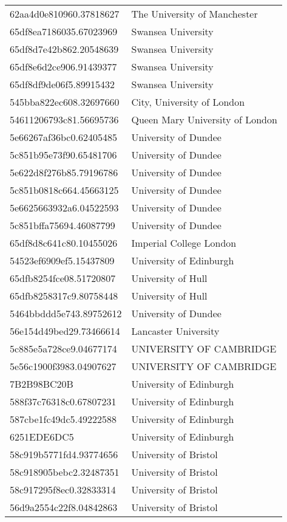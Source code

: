 \begin{tabular}{ll}
62aa4d0e810960.37818627 & The University of Manchester \\
65df8ea7186035.67023969 & Swansea University \\
65df8d7e42b862.20548639 & Swansea University \\
65df8e6d2ce906.91439377 & Swansea University \\
65df8df9de06f5.89915432 & Swansea University \\
545bba822ec608.32697660 & City, University of London \\
54611206793c81.56695736 & Queen Mary University of London \\
5e66267af36bc0.62405485 & University of Dundee \\
5c851b95e73f90.65481706 & University of Dundee \\
5e622d8f276b85.79196786 & University of Dundee \\
5c851b0818c664.45663125 & University of Dundee \\
5e6625663932a6.04522593 & University of Dundee \\
5c851bffa75694.46087799 & University of Dundee \\
65df8d8c641c80.10455026 & Imperial College London \\
54523ef6909ef5.15437809 & University of Edinburgh \\
65dfb8254fce08.51720807 & University of Hull \\
65dfb8258317c9.80758448 & University of Hull \\
5464bbddd5e743.89752612 & University of Dundee \\
56e154d49bed29.73466614 & Lancaster University \\
5c885e5a728ce9.04677174 & UNIVERSITY OF CAMBRIDGE \\
5e56c1900f3983.04907627 & UNIVERSITY OF CAMBRIDGE \\
7B2B98BC20B & University of Edinburgh \\
588f37c76318c0.67807231 & University of Edinburgh \\
587cbe1fc49dc5.49222588 & University of Edinburgh \\
6251EDE6DC5 & University of Edinburgh \\
58c919b5771fd4.93774656 & University of Bristol \\
58c918905bebc2.32487351 & University of Bristol \\
58c917295f8ec0.32833314 & University of Bristol \\
56d9a2554c22f8.04842863 & University of Bristol \\

\end{tabular}
